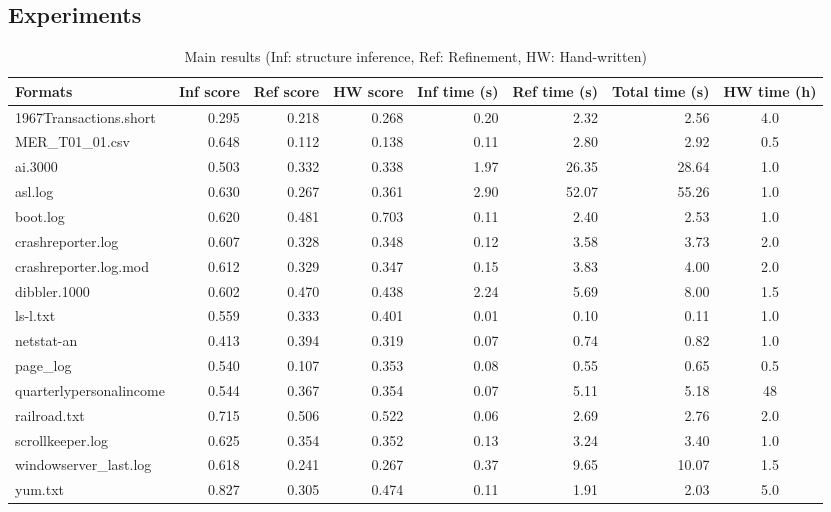 \subsection{Experiments}
\begin{table*}
\begin{center}
\begin{tabular}{|l||r|r|r||r|r|r|c|} \hline
Formats 	& Inf score 	&Ref score	& HW score 	& Inf time (s) 	& Ref time (s) 	& Total time (s) & HW time (h)\\ \hline \hline
1967Transactions.short & 0.295 	&0.218 		&0.268		& 0.20&      2.32&      2.56 	& 4.0  \\ \hline
MER\_T01\_01.csv & 0.648 	&0.112		&0.138		& 0.11&      2.80&      2.92 	& 0.5  \\ \hline
ai.3000          & 0.503	&0.332		&0.338		& 1.97&      26.35&     28.64	& 1.0  \\ \hline
asl.log          & 0.630	&0.267		&0.361		& 2.90&      52.07&     55.26	& 1.0  \\ \hline
boot.log         & 0.620	&0.481		&0.703		& 0.11&      2.40&      2.53 	& 1.0  \\ \hline
crashreporter.log & 0.607	&0.328		&0.348		& 0.12&      3.58&      3.73 	& 2.0  \\ \hline
crashreporter.log.mod & 0.612	&0.329		&0.347		& 0.15&      3.83&      4.00 	& 2.0  \\ \hline
dibbler.1000     & 0.602	&0.470		&0.438		& 2.24&      5.69&      8.00 	& 1.5  \\ \hline
ls-l.txt         &0.559		&0.333		&0.401		& 0.01&      0.10&      0.11 	& 1.0  \\ \hline
netstat-an       &0.413		&0.394		&0.319		& 0.07&      0.74&      0.82 	& 1.0  \\ \hline
page\_log        & 0.540	&0.107		&0.353		& 0.08&      0.55&      0.65 	& 0.5   \\ \hline
quarterlypersonalincome & 0.544	&0.367		&0.354		& 0.07&      5.11&      5.18 	& 48  \\ \hline
railroad.txt     &0.715		&0.506		&0.522		& 0.06&      2.69&      2.76 	& 2.0  \\ \hline
scrollkeeper.log & 0.625	&0.354		&0.352		& 0.13&      3.24&      3.40 	& 1.0  \\ \hline
windowserver\_last.log &0.618	&0.241		&0.267		& 0.37&      9.65&      10.07	& 1.5  \\ \hline
yum.txt          &0.827		&0.305		&0.474		& 0.11&      1.91&      2.03 	& 5.0  \\ \hline
\end{tabular}
\caption{Main results (Inf: structure inference, Ref: Refinement, HW: Hand-written)}
\label{tab:results}
\end{center}
\end{table*}

